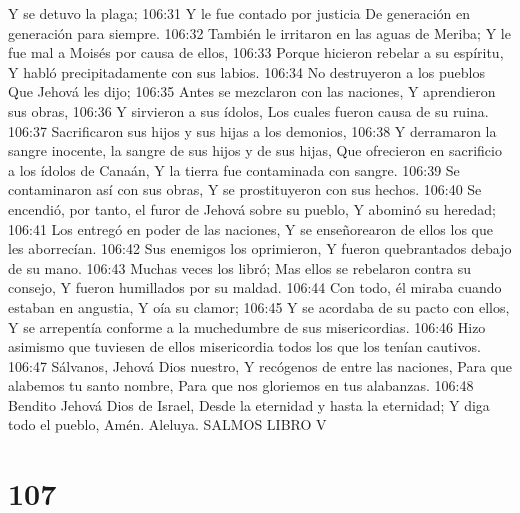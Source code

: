 Y se detuvo la plaga; 
106:31 Y le fue contado por justicia 
De generación en generación para siempre. 
106:32 También le irritaron en las aguas de Meriba; 
Y le fue mal a Moisés por causa de ellos, 
106:33 Porque hicieron rebelar a su espíritu, 
Y habló precipitadamente con sus labios. 
106:34 No destruyeron a los pueblos 
Que Jehová les dijo; 
106:35 Antes se mezclaron con las naciones, 
Y aprendieron sus obras, 
106:36 Y sirvieron a sus ídolos, 
Los cuales fueron causa de su ruina. 
106:37 Sacrificaron sus hijos y sus hijas a los demonios, 
106:38 Y derramaron la sangre inocente, la sangre de sus hijos y de sus hijas, 
Que ofrecieron en sacrificio a los ídolos de Canaán, 
Y la tierra fue contaminada con sangre. 
106:39 Se contaminaron así con sus obras, 
Y se prostituyeron con sus hechos. 
106:40 Se encendió, por tanto, el furor de Jehová sobre su pueblo, 
Y abominó su heredad; 
106:41 Los entregó en poder de las naciones, 
Y se enseñorearon de ellos los que les aborrecían. 
106:42 Sus enemigos los oprimieron, 
Y fueron quebrantados debajo de su mano. 
106:43 Muchas veces los libró; 
Mas ellos se rebelaron contra su consejo, 
Y fueron humillados por su maldad. 
106:44 Con todo, él miraba cuando estaban en angustia, 
Y oía su clamor; 
106:45 Y se acordaba de su pacto con ellos, 
Y se arrepentía conforme a la muchedumbre de sus misericordias. 
106:46 Hizo asimismo que tuviesen de ellos misericordia todos los que los tenían cautivos. 
106:47 Sálvanos, Jehová Dios nuestro, 
Y recógenos de entre las naciones, 
Para que alabemos tu santo nombre, 
Para que nos gloriemos en tus alabanzas. 
106:48 Bendito Jehová Dios de Israel, 
Desde la eternidad y hasta la eternidad; 
Y diga todo el pueblo, Amén. 
Aleluya.
SALMOS 
LIBRO V

\chapter{107}

